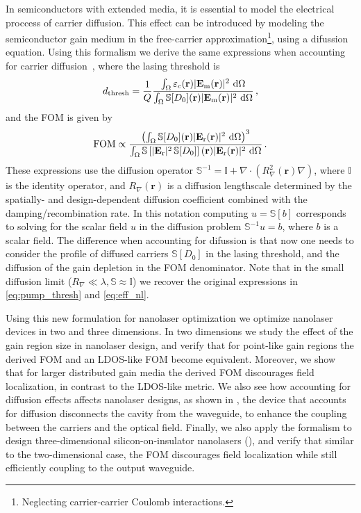 In semiconductors with extended media, it is essential to model the electrical proccess of carrier diffusion. This effect can be introduced by modeling the semiconductor gain medium in the free-carrier approximation\footnote{Neglecting carrier-carrier Coulomb interactions.}, using a difussion 
equation\cite{csalt}. Using this formalism we derive the same expressions when accounting for carrier diffusion~\cite{ownpub4}, where the lasing threshold is
\begin{equation}\label{eq:pump_thresh_diff}
    d_\text{thresh} = \frac{1}{Q} \frac{\int_{\Omega} \varepsilon_c(\mathbf{r})|\mathbf{E}_{\text{m}}(\mathbf{r})|^2\,  \mathop{}\!\text{d} \Omega}{\int_{\Omega} \mathbb{S} [D_0] (\mathbf{r}) |\mathbf{E}_{\text{m}}(\mathbf{r})|^2\,  \mathop{}\!\text{d} \Omega}\,,
\end{equation}
and the FOM is given by
\begin{equation}\label{eq:eff_diff}
    \text{FOM} \propto  \frac{\left(\int_{\Omega} \mathbb{S} [D_0](\mathbf{r}) |\mathbf{E}_{\text{r}}(\mathbf{r})|^2 \,  \mathop{}\!\text{d} \Omega\right)^3} {\int_{\Omega} \mathbb{S}\left[ |\mathbf{E}_{\text{r}}|^2\, \mathbb{S} [D_0] \right] (\mathbf{r})|\mathbf{E}_{\text{r}}(\mathbf{r})|^2 \,  \mathop{}\!\text{d} \Omega}\,.
\end{equation}
These expressions use the diffusion operator $\mathbb{S}^{-1}= \mathbb{I}+\nabla \cdot (R_\nabla^2(\mathbf{r}) \nabla)$, where $\mathbb{I}$ is the identity operator, and $R_\nabla (\mathbf{r})$ is a diffusion lengthscale determined by the spatially- and design-dependent diffusion coefficient combined with the damping/recombination rate. 
In this notation computing $u = \mathbb{S}[b]$ corresponds to solving for the scalar field $u$ in the diffusion problem $\mathbb{S}^{-1}u=b$, where $b$ is a scalar field. 
The difference when accounting for difussion is that now one needs to consider the profile of diffused carriers $\mathbb{S} [D_0]$ in the lasing threshold, and the diffusion of the gain depletion
in the FOM denominator. Note that in the small diffusion limit ($R_\nabla \ll \lambda, \mathbb{S} \approx \mathbb{I}$)
we recover the original expressions in \eqref{eq:pump_thresh} and \eqref{eq:eff_nl}.

Using this new formulation for nanolaser optimization we optimize nanolaser devices in two and three dimensions. In two dimensions we study the effect of the gain region size in 
nanolaser design, and verify that for point-like gain regions the derived FOM and an LDOS-like FOM become equivalent. Moreover, we show that for
larger distributed gain media the derived FOM discourages field localization, in contrast to the LDOS-like metric. We also see how accounting for diffusion effects
affects nanolaser designs, as shown in , the device that accounts for diffusion disconnects the cavity from the waveguide, to 
enhance the coupling between the carriers and the optical field. Finally, we also apply the formalism to design three-dimensional silicon-on-insulator nanolasers (), 
and verify that similar to the two-dimensional case, the FOM discourages field localization while still efficiently coupling to the output waveguide.


